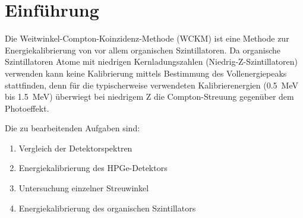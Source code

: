 \section{Einführung}
Die Weitwinkel-Compton-Koinzidenz-Methode (WCKM) ist eine Methode zur Energiekalibrierung von vor allem organischen Szintillatoren. Da organische Szintillatoren Atome mit niedrigen Kernladungszahlen (Niedrig-Z-Szintillatoren) verwenden kann keine Kalibrierung mittels Bestimmung des Vollenergiepeaks stattfinden, denn für die typischerweise verwendeten Kalibrierenergien (\SI{0.5}{\mega\electronvolt} bis \SI{1.5}{\mega\electronvolt}) überwiegt bei niedrigem Z die Compton-Streuung gegenüber dem Photoeffekt.

Die zu bearbeitenden Aufgaben sind:
\begin{enumerate}
    \item Vergleich der Detektorspektren
    \item Energiekalibrierung des HPGe-Detektors
    \item Untersuchung einzelner Streuwinkel
    \item Energiekalibrierung des organischen Szintillators
\end{enumerate}
